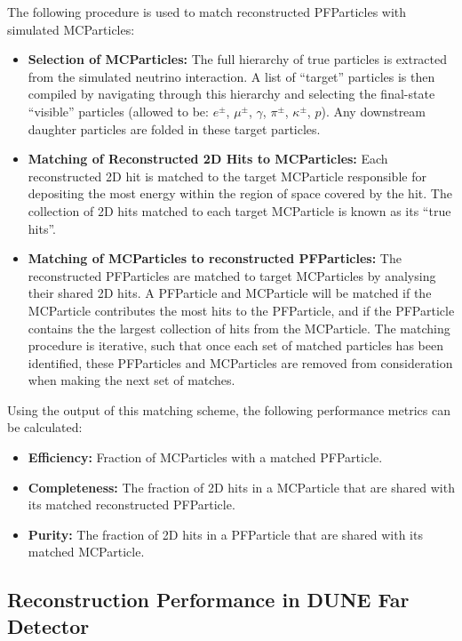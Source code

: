 The following procedure is used to match reconstructed PFParticles with simulated MCParticles:

\begin{itemize}
\item {\bf Selection of MCParticles:} The full hierarchy of true particles is extracted from the simulated neutrino interaction. A list of ``target'' particles is then compiled by navigating through this hierarchy and selecting the final-state ``visible'' particles (allowed to be: $e^{\pm}$, $\mu^{\pm}$, $\gamma$, $\pi^{\pm}$, $\kappa^{\pm}$, $p$). Any downstream daughter particles are folded in these target particles.
\item {\bf Matching of Reconstructed 2D Hits to MCParticles:} Each reconstructed 2D hit is matched to the target MCParticle responsible for depositing the most energy within the region of space covered by the hit. The collection of 2D hits matched to each target MCParticle is known as its ``true hits''.
\item {\bf Matching of MCParticles to reconstructed PFParticles:} The reconstructed PFParticles are matched to target MCParticles by analysing their shared 2D hits. A PFParticle and MCParticle will be matched if the MCParticle contributes the most hits to the PFParticle, and if the PFParticle contains the the largest collection of hits from the MCParticle. The matching procedure is iterative, such that once each set of matched particles has been identified, these PFParticles and MCParticles are removed from consideration when making the next set of matches. 
\end{itemize}

Using the output of this matching scheme, the following performance metrics can be calculated:

\begin{itemize}
\item{\bf Efficiency:} Fraction of MCParticles with a matched PFParticle.
\item{\bf Completeness:} The fraction of 2D hits in a MCParticle that are shared with its matched reconstructed PFParticle.
\item{\bf Purity:} The fraction of 2D hits in a PFParticle that are shared with its matched MCParticle.
\end{itemize}

\subsection{Reconstruction Performance in DUNE Far Detector}
\label{sec:Pandora:DUNEFD}

